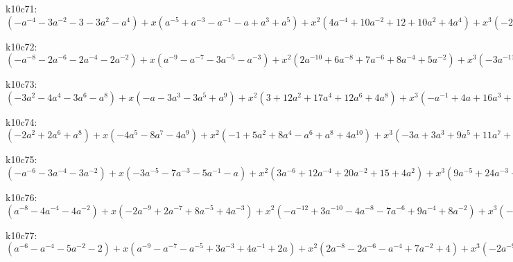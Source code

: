 k10c71: $ (-a^{-4}-3a^{-2}-3-3a^{2}-a^{4}) +x(a^{-5}+a^{-3}-a^{-1}-a+a^{3}+a^{5}) +x^{2}(4a^{-4}+10a^{-2}+12+10a^{2}+4a^{4}) +x^{3}(-2a^{-5}+7a^{-1}+7a-2a^{5}) +x^{4}(-6a^{-4}-12a^{-2}-12-12a^{2}-6a^{4}) +x^{5}(a^{-5}-5a^{-3}-15a^{-1}-15a-5a^{3}+a^{5}) +x^{6}(3a^{-4}+2a^{-2}-2+2a^{2}+3a^{4}) +x^{7}(4a^{-3}+8a^{-1}+8a+4a^{3}) +x^{8}(3a^{-2}+6+3a^{2}) +x^{9}(a^{-1}+a) $

k10c72: $ (-a^{-8}-2a^{-6}-2a^{-4}-2a^{-2}) +x(a^{-9}-a^{-7}-3a^{-5}-a^{-3}) +x^{2}(2a^{-10}+6a^{-8}+7a^{-6}+8a^{-4}+5a^{-2}) +x^{3}(-3a^{-11}+9a^{-7}+11a^{-5}+5a^{-3}) +x^{4}(a^{-12}-8a^{-10}-11a^{-8}-4a^{-6}-6a^{-4}-4a^{-2}) +x^{5}(4a^{-11}-7a^{-9}-19a^{-7}-14a^{-5}-6a^{-3}) +x^{6}(7a^{-10}+2a^{-8}-8a^{-6}-2a^{-4}+a^{-2}) +x^{7}(7a^{-9}+9a^{-7}+4a^{-5}+2a^{-3}) +x^{8}(4a^{-8}+6a^{-6}+2a^{-4}) +x^{9}(a^{-7}+a^{-5}) $

k10c73: $ (-3a^{2}-4a^{4}-3a^{6}-a^{8}) +x(-a-3a^{3}-3a^{5}+a^{9}) +x^{2}(3+12a^{2}+17a^{4}+12a^{6}+4a^{8}) +x^{3}(-a^{-1}+4a+16a^{3}+14a^{5}+a^{7}-2a^{9}) +x^{4}(-7-16a^{2}-17a^{4}-14a^{6}-6a^{8}) +x^{5}(a^{-1}-10a-26a^{3}-21a^{5}-5a^{7}+a^{9}) +x^{6}(4+2a^{2}-2a^{4}+3a^{6}+3a^{8}) +x^{7}(6a+12a^{3}+10a^{5}+4a^{7}) +x^{8}(4a^{2}+7a^{4}+3a^{6}) +x^{9}(a^{3}+a^{5}) $

k10c74: $ (-2a^{2}+2a^{6}+a^{8}) +x(-4a^{5}-8a^{7}-4a^{9}) +x^{2}(-1+5a^{2}+8a^{4}-a^{6}+a^{8}+4a^{10}) +x^{3}(-3a+3a^{3}+9a^{5}+11a^{7}+8a^{9}) +x^{4}(1-7a^{2}-9a^{4}+3a^{6}-4a^{10}) +x^{5}(3a-6a^{3}-12a^{5}-10a^{7}-7a^{9}) +x^{6}(5a^{2}+a^{4}-9a^{6}-4a^{8}+a^{10}) +x^{7}(5a^{3}+5a^{5}+2a^{7}+2a^{9}) +x^{8}(3a^{4}+5a^{6}+2a^{8}) +x^{9}(a^{5}+a^{7}) $

k10c75: $ (-a^{-6}-3a^{-4}-3a^{-2}) +x(-3a^{-5}-7a^{-3}-5a^{-1}-a) +x^{2}(3a^{-6}+12a^{-4}+20a^{-2}+15+4a^{2}) +x^{3}(9a^{-5}+24a^{-3}+17a^{-1}-a-3a^{3}) +x^{4}(-3a^{-6}-9a^{-4}-21a^{-2}-24-8a^{2}+a^{4}) +x^{5}(-9a^{-5}-29a^{-3}-29a^{-1}-5a+4a^{3}) +x^{6}(a^{-6}-3a^{-4}-4a^{-2}+7+7a^{2}) +x^{7}(3a^{-5}+9a^{-3}+13a^{-1}+7a) +x^{8}(3a^{-4}+7a^{-2}+4) +x^{9}(a^{-3}+a^{-1}) $

k10c76: $ (a^{-8}-4a^{-4}-4a^{-2}) +x(-2a^{-9}+2a^{-7}+8a^{-5}+4a^{-3}) +x^{2}(-a^{-12}+3a^{-10}-4a^{-8}-7a^{-6}+9a^{-4}+8a^{-2}) +x^{3}(-3a^{-11}+7a^{-9}-3a^{-7}-15a^{-5}-2a^{-3}) +x^{4}(a^{-12}-7a^{-10}+4a^{-8}+10a^{-6}-7a^{-4}-5a^{-2}) +x^{5}(3a^{-11}-8a^{-9}-2a^{-7}+7a^{-5}-2a^{-3}) +x^{6}(5a^{-10}-3a^{-8}-9a^{-6}+a^{-2}) +x^{7}(5a^{-9}+2a^{-7}-2a^{-5}+a^{-3}) +x^{8}(3a^{-8}+4a^{-6}+a^{-4}) +x^{9}(a^{-7}+a^{-5}) $

k10c77: $ (a^{-6}-a^{-4}-5a^{-2}-2) +x(a^{-9}-a^{-7}-a^{-5}+3a^{-3}+4a^{-1}+2a) +x^{2}(2a^{-8}-2a^{-6}-a^{-4}+7a^{-2}+4) +x^{3}(-2a^{-9}+2a^{-7}+6a^{-5}-5a^{-1}-3a) +x^{4}(-6a^{-8}+8a^{-4}-3a^{-2}-5) +x^{5}(a^{-9}-7a^{-7}-9a^{-5}-3a^{-3}-a^{-1}+a) +x^{6}(3a^{-8}-3a^{-6}-9a^{-4}-a^{-2}+2) +x^{7}(4a^{-7}+4a^{-5}+2a^{-3}+2a^{-1}) +x^{8}(3a^{-6}+5a^{-4}+2a^{-2}) +x^{9}(a^{-5}+a^{-3}) $

